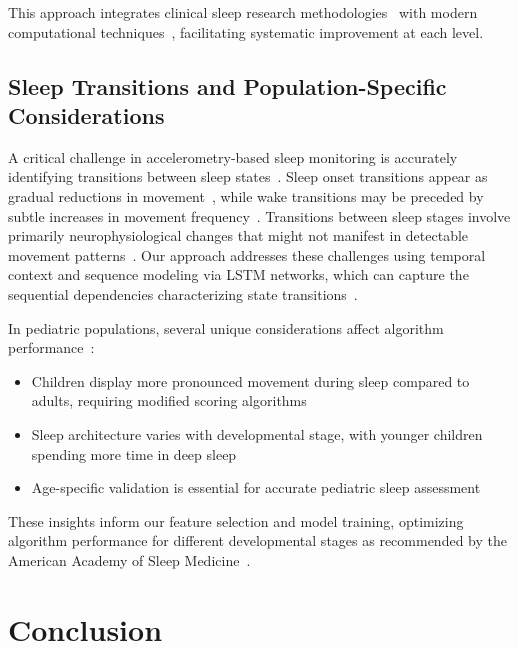\documentclass[conference]{IEEEtran}
\begin{document}
This approach integrates clinical sleep research methodologies~\cite{aasm2007, littner2003} with modern computational techniques~\cite{zhang2020machine, behar2013}, facilitating systematic improvement at each level.

\subsection{Sleep Transitions and Population-Specific Considerations}

A critical challenge in accelerometry-based sleep monitoring is accurately identifying transitions between sleep states~\cite{aasm2015, littner2003}. Sleep onset transitions appear as gradual reductions in movement~\cite{sadeh1994activity}, while wake transitions may be preceded by subtle increases in movement frequency~\cite{kushida2001}. Transitions between sleep stages involve primarily neurophysiological changes that might not manifest in detectable movement patterns~\cite{rechtschaffen1968, sadeh2011}. Our approach addresses these challenges using temporal context and sequence modeling via LSTM networks, which can capture the sequential dependencies characterizing state transitions~\cite{borbely1982}.

In pediatric populations, several unique considerations affect algorithm performance~\cite{arXiv2023, acebo2006}:

\begin{itemize}
	\item Children display more pronounced movement during sleep compared to adults, requiring modified scoring algorithms~\cite{sadeh2011, acebo2006}
	\item Sleep architecture varies with developmental stage, with younger children spending more time in deep sleep~\cite{rechtschaffen1968, aasm2007}
	\item Age-specific validation is essential for accurate pediatric sleep assessment~\cite{sadeh2011}
\end{itemize}

These insights inform our feature selection and model training, optimizing algorithm performance for different developmental stages as recommended by the American Academy of Sleep Medicine~\cite{littner2003, sadeh2011}.

\section{Conclusion}




\end{document}
